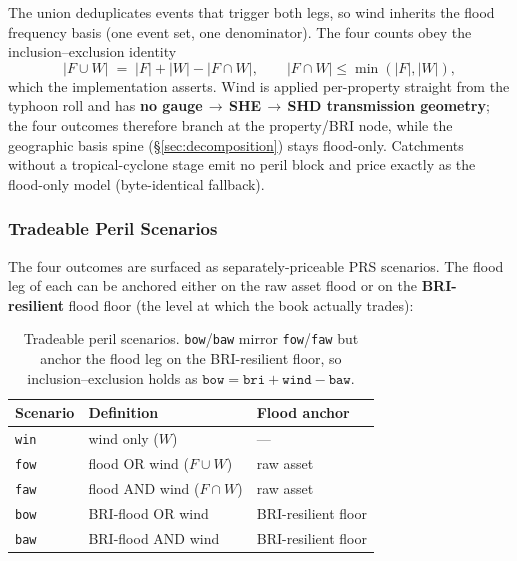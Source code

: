 \documentclass[11pt,a4paper]{article}
\begin{document}
\noindent The union deduplicates events that trigger both legs, so wind inherits
the flood frequency basis (one event set, one denominator). The four counts obey
the inclusion--exclusion identity
\begin{equation}
    |F \cup W| \;=\; |F| + |W| - |F \cap W|,
    \qquad |F \cap W| \le \min(|F|, |W|),
    \label{eq:inclusion_exclusion}
\end{equation}
which the implementation asserts. Wind is applied per-property straight from the
typhoon roll and has \textbf{no gauge\,$\to$\,SHE\,$\to$\,SHD transmission
geometry}; the four outcomes therefore branch at the property/BRI node, while
the geographic basis spine (\S\ref{sec:decomposition}) stays flood-only.
Catchments without a tropical-cyclone stage emit no peril block and price exactly
as the flood-only model (byte-identical fallback).

\subsubsection{Tradeable Peril Scenarios}

The four outcomes are surfaced as separately-priceable PRS scenarios. The
flood leg of each can be anchored either on the raw asset flood or on the
\textbf{BRI-resilient} flood floor (the level at which the book actually trades):

\begin{table}[H]
    \centering
    \begin{tabular}{lll}
        \toprule
        \textbf{Scenario} & \textbf{Definition} & \textbf{Flood anchor} \\
        \midrule
        \texttt{win} & wind only ($W$)                         & --- \\
        \texttt{fow} & flood OR wind ($F \cup W$)              & raw asset \\
        \texttt{faw} & flood AND wind ($F \cap W$)             & raw asset \\
        \texttt{bow} & BRI-flood OR wind                       & BRI-resilient floor \\
        \texttt{baw} & BRI-flood AND wind                      & BRI-resilient floor \\
        \bottomrule
    \end{tabular}
    \caption{Tradeable peril scenarios. \texttt{bow}/\texttt{baw} mirror
    \texttt{fow}/\texttt{faw} but anchor the flood leg on the BRI-resilient floor,
    so inclusion--exclusion holds as $\texttt{bow} = \texttt{bri} + \texttt{wind}
    - \texttt{baw}$.}
    \label{tab:peril_scenarios}
\end{table}
\end{document}

